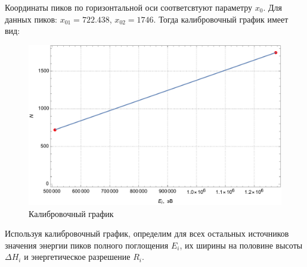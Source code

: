 \documentclass[a4paper, 12pt]{article}
\begin{document}
	 \par
	 Координаты пиков по горизонтальной оси соответсвтуют параметру $x_0$. Для данных пиков: $x_{01}=722.438$, $x_{02}=1746$. Тогда калибровочный график имеет вид:
	 \begin{figure}[!htb]
	 	\centering
	 	\includegraphics[scale=0.7]{calibrator.pdf}
	 	\caption{Калибровочный график}
	 \end{figure}
	 \par
	 Используя калибровочный график, определим для всех остальных источников значения энергии пиков полного поглощения $E_i$, их ширины на половине высоты $\Delta H_i$ и энергетическое разрешение $R_i$.
\end{document}

